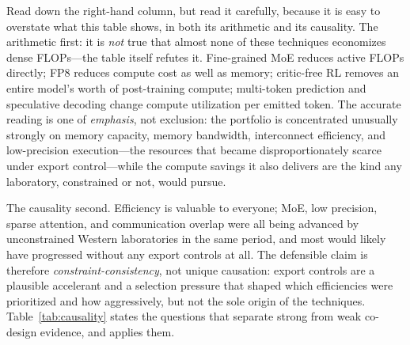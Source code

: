 Read down the right-hand column, but read it carefully, because it is easy to overstate what this table shows, in both its arithmetic and its causality. The arithmetic first: it is \emph{not} true that almost none of these techniques economizes dense FLOPs---the table itself refutes it. Fine-grained MoE reduces active FLOPs directly; FP8 reduces compute cost as well as memory; critic-free RL removes an entire model's worth of post-training compute; multi-token prediction and speculative decoding change compute utilization per emitted token. The accurate reading is one of \emph{emphasis}, not exclusion: the portfolio is concentrated unusually strongly on memory capacity, memory bandwidth, interconnect efficiency, and low-precision execution---the resources that became disproportionately scarce under export control---while the compute savings it also delivers are the kind any laboratory, constrained or not, would pursue.

The causality second. Efficiency is valuable to everyone; MoE, low precision, sparse attention, and communication overlap were all being advanced by unconstrained Western laboratories in the same period, and most would likely have progressed without any export controls at all. The defensible claim is therefore \emph{constraint-consistency}, not unique causation: export controls are a plausible accelerant and a selection pressure that shaped which efficiencies were prioritized and how aggressively, but not the sole origin of the techniques. Table~\ref{tab:causality} states the questions that separate strong from weak co-design evidence, and applies them.

